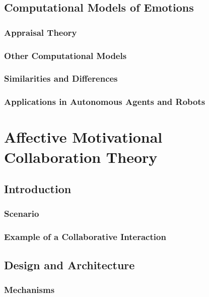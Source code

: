 \documentclass[12pt]{report}
\begin{document}
\section{Computational Models of Emotions}

\subsection{Appraisal Theory}

\subsection{Other Computational Models}

\subsection{Similarities and Differences}

\subsection{Applications in Autonomous Agents and Robots}

\chapter{Affective Motivational Collaboration Theory}
\label{ch:amct}

\section{Introduction}

\subsection{Scenario}

\subsection{Example of a Collaborative Interaction}

\section{Design and Architecture}

\subsection{Mechanisms}
\end{document}
